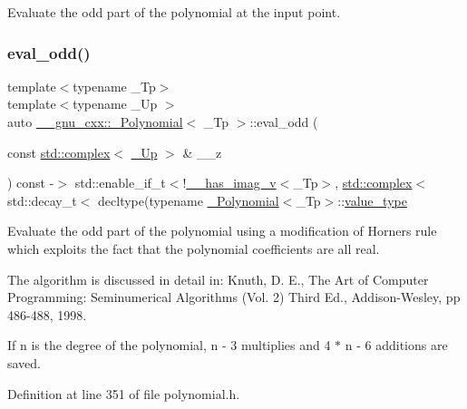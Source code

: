 Evaluate the odd part of the polynomial at the input point. \mbox{\label{class____gnu__cxx_1_1__Polynomial_a5348bf4c4db826660a133ab731f775c1}} 
\subsubsection{\texorpdfstring{eval\+\_\+odd()}{eval\_odd()}\hspace{0.1cm}{\footnotesize\ttfamily [3/3]}}
{\footnotesize\ttfamily template$<$typename \+\_\+\+Tp$>$ \\
template$<$typename \+\_\+\+Up $>$ \\
auto \hyperlink{class____gnu__cxx_1_1__Polynomial}{\+\_\+\+\_\+gnu\+\_\+cxx\+::\+\_\+\+Polynomial}$<$ \+\_\+\+Tp $>$\+::eval\+\_\+odd (\begin{DoxyParamCaption}\item[{const \hyperlink{classstd_1_1complex}{std\+::complex}$<$ \hyperlink{class____gnu__cxx_1_1__Polynomial_a242114d4b86648a5dff67a8221f80d40}{\+\_\+\+Up} $>$ \&}]{\+\_\+\+\_\+z }\end{DoxyParamCaption}) const -\/$>$ std\+::enable\+\_\+if\+\_\+t$<$!\hyperlink{namespace____gnu__cxx_afa2404a914b06f950f3a46e75aca51a9}{\+\_\+\+\_\+has\+\_\+imag\+\_\+v}$<$\+\_\+\+Tp$>$,
			\hyperlink{classstd_1_1complex}{std\+::complex}$<$std\+::decay\+\_\+t$<$
		decltype(typename \hyperlink{class____gnu__cxx_1_1__Polynomial}{\+\_\+\+Polynomial}$<$\+\_\+\+Tp$>$\+::\hyperlink{class____gnu__cxx_1_1__Polynomial_a725563351f50e76084a7a016c06f8a53}{value\+\_\+type}\hspace{0.3cm}{\ttfamily [inline]}}

Evaluate the odd part of the polynomial using a modification of Horner\textquotesingle{}s rule which exploits the fact that the polynomial coefficients are all real.

The algorithm is discussed in detail in\+: Knuth, D. E., The Art of Computer Programming\+: Seminumerical Algorithms (Vol. 2) Third Ed., Addison-\/\+Wesley, pp 486-\/488, 1998.

If n is the degree of the polynomial, n -\/ 3 multiplies and 4 $\ast$ n -\/ 6 additions are saved. 

Definition at line 351 of file polynomial.\+h.


